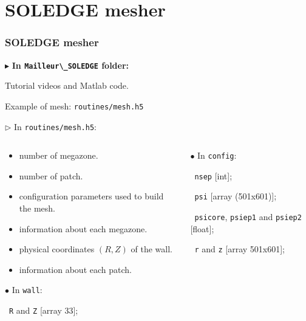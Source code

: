 \documentclass[t,10pt,a3paper]{beamer} %
\begin{document}
\section{SOLEDGE mesher}
	\begin{frame} %
	\frametitle{\color{vert}\textbf{SOLEDGE mesher}}
	\footnotesize	

	{\color{vert}$\blacktriangleright$ }
	\textbf{In \verb|Mailleur\_SOLEDGE| folder:} \par
	\qquad {\color{vert} $\rightarrow$} Tutorial videos and Matlab code. \par 
	\qquad {\color{vert} $\rightarrow$} Example of mesh: \verb|routines/mesh.h5| \par 

	\vspace*{0.15cm}

	{\color{vert}$\triangleright$ }
	In \verb|routines/mesh.h5|: \par 
	\begin{columns}
	\scriptsize
	\begin{column}{0.3\textwidth}
	\begin{itemize}
		\item[\verb|NMegazones|] [int] number of megazone.
		\item[\verb|NZones|] [int] number of patch. 
		\item[\verb|config|] [Group] configuration parameters used to build the mesh.
		\item[6 \verb|megazone1|] [Group] information about each megazone. 
		\item[\verb|wall|] [Group] physical coordinates $(R,Z)$ of the wall. 
		\item[28 \verb|zone1|] [Group] information about each patch. 
	\end{itemize}

	\vspace*{0.15cm}
	{\color{vert} $\bullet$}  In \verb|wall|: \par 
	\ \verb|R| and \verb|Z| [array 33]; \par 

	\end{column}
	\begin{column}{0.6\textwidth}
	{\color{vert} $\bullet$} In \verb|config|: \par 
	\ \verb|nsep| [int]; \par 
	\ \verb|psi| [array (501x601)]; \par 
	\ \verb|psicore|, \verb|psiep1| and \verb|psiep2| [float]; \par 
	\ \verb|r| and \verb|z|  [array 501x601]; \par 



\end{column}
\end{columns}
\end{frame}
\end{document}
